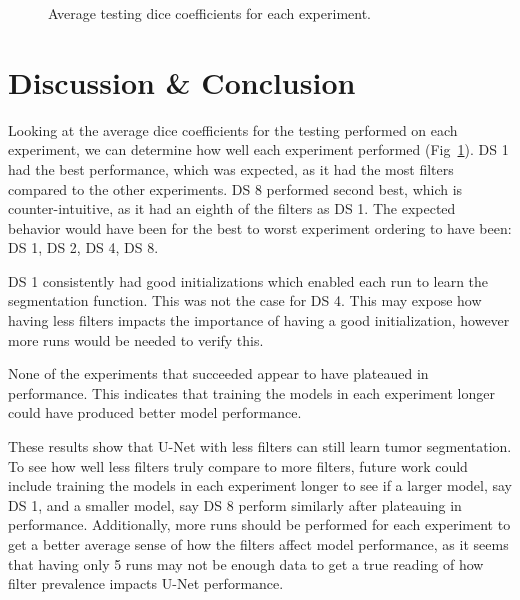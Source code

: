 \documentclass[conference]{IEEEtran}
\begin{document}
\begin{figure}
\begin{tabular}{cc}
\end{tabular}
\caption{ Average testing dice coefficients for each experiment. }
\label{fig:testing_dice}
\end{figure}

\section{Discussion \& Conclusion}

Looking at the average dice coefficients for the testing performed on each experiment, we can determine how well each experiment performed (Fig~\ref{fig:testing_dice}). DS 1 had the best performance, which was expected, as it had the most filters compared to the other experiments. DS 8 performed second best, which is counter-intuitive, as it had an eighth of the filters as DS 1. The expected behavior would have been for the best to worst experiment ordering to have been: DS 1, DS 2, DS 4, DS 8. 

DS 1 consistently had good initializations which enabled each run to learn the segmentation function. This was not the case for DS 4. This may expose how having less filters impacts the importance of having a good initialization, however more runs would be needed to verify this. 

None of the experiments that succeeded appear to have plateaued in performance. This indicates that training the models in each experiment longer could have produced better model performance.

These results show that U-Net with less filters can still learn tumor segmentation. To see how well less filters truly compare to more filters, future work could include training the models in each experiment longer to see if a larger model, say DS 1, and a smaller model, say DS 8 perform similarly after plateauing in performance. Additionally, more runs should be performed for each experiment to get a better average sense of how the filters affect model performance, as it seems that having only 5 runs may not be enough data to get a true reading of how filter prevalence impacts U-Net performance.


\end{document}

